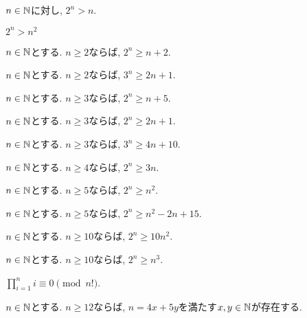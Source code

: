 \begin{prop}
$n\in\mathbb{N}$に対し, $2^n> n$.
\end{prop}

\begin{prop}
  $2^n>n^2$
\end{prop}

\begin{prop}
$n\in\mathbb{N}$とする.
  $n\geq 2$ならば, $2^n \geq n+2$.
\end{prop}

\begin{prop}
$n\in\mathbb{N}$とする.
  $n\geq 2$ならば, $3^n \geq 2n+1$.
\end{prop}


\begin{prop}
$n\in\mathbb{N}$とする.
  $n\geq 3$ならば, $2^n\geq n+5$.
\end{prop}

\begin{prop}
$n\in\mathbb{N}$とする.
  $n\geq 3$ならば, $2^n\geq 2n+1$.
\end{prop}

\begin{prop}
$n\in\mathbb{N}$とする.
  $n\geq 3$ならば, $3^n\geq 4n+10$.
\end{prop}

\begin{prop}
$n\in\mathbb{N}$とする.
  $n\geq 4$ならば, $2^n\geq 3n$.
\end{prop}


\begin{prop}
$n\in\mathbb{N}$とする.
  $n\geq 5$ならば, $2^n\geq n^2$.
\end{prop}

\begin{prop}
$n\in\mathbb{N}$とする.
  $n\geq 5$ならば, $2^n\geq n^2-2n+15$.
\end{prop}


\begin{prop}
$n\in\mathbb{N}$とする.
  $n\geq 10$ならば, $2^n\geq 10n^2$.
\end{prop}

\begin{prop}
$n\in\mathbb{N}$とする.
  $n\geq 10$ならば, $2^n\geq n^3$.
\end{prop}

\begin{prop}
$\prod_{i=1}^n i \equiv 0 \pmod{n!}$.
\end{prop}



\begin{prop}
$n\in\mathbb{N}$とする.
  $n\geq 12$ならば, $n=4x+5y$を満たす$x,y\in\mathbb{N}$が存在する.
\end{prop}


